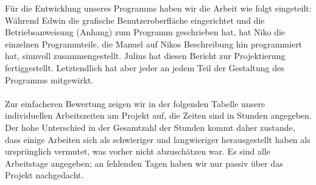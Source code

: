\documentclass[a4paper, 11pt, titlepage]{article}
\begin{document}
Für die Entwicklung unseres Programms haben wir die Arbeit wie folgt eingeteilt: Während Edwin die grafische Benutzeroberfläche eingerichtet und die Betriebsanweisung (Anhang) zum Programm geschrieben hat, hat Niko die einzelnen Programmteile, die Manuel auf Nikos Beschreibung hin programmiert hat, sinnvoll zusammengestellt. Julius hat diesen Bericht zur Projektierung fertiggestellt. Letztendlich hat aber jeder an jedem Teil der Gestaltung des Programms mitgewirkt.\\\\
Zur einfacheren Bewertung zeigen wir in der folgenden Tabelle unsere individuellen Arbeitszeiten am Projekt auf, die Zeiten sind in Stunden angegeben. Der hohe Unterschied in   der Gesamtzahl der Stunden kommt daher zustande, dass einige Arbeiten sich als schwieriger und langwieriger herausgestellt haben als ursprünglich vermutet, was vorher nicht abzuschätzen war. Es sind alle Arbeitstage angegeben; an fehlenden Tagen haben wir nur passiv über das Projekt nachgedacht.
\end{document}
